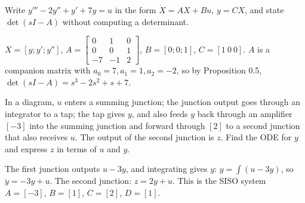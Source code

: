 \begin{qbox}[title={Q1.2 (medium)}]
Write $y'''-2y''+y'+7y=u$ in the form $\dot X=AX+Bu$, $y=CX$, and state $\det(sI-A)$ without computing a determinant.
\end{qbox}
\begin{solbox}
$X=[y;y';y'']$, $A=\begin{bmatrix}0&1&0\\0&0&1\\-7&-1&2\end{bmatrix}$, $B=[0;0;1]$, $C=[1\ 0\ 0]$.
$A$ is a companion matrix with $a_0=7,a_1=1,a_2=-2$, so by Proposition 0.5, $\det(sI-A)=s^3-2s^2+s+7$.
\end{solbox}

\begin{qbox}[title={Q1.3 (harder: reading a diagram)}]
In a diagram, $u$ enters a summing junction; the junction output goes through an integrator to a tap; the tap gives $y$, and also feeds $y$ back through
an amplifier $[-3]$ into the summing junction and forward through $[2]$ to a second junction that also receives $u$. The output of the second junction is $z$. Find the ODE for $y$ and express $z$ in terms of $u$ and $y$.
\end{qbox}
\begin{solbox}
The first junction outputs $u-3y$, and integrating gives $y$: $y=\int(u-3y)$, so $\dot y=-3y+u$. The second junction: $z=2y+u$.
This is the SISO system $A=[-3]$, $B=[1]$, $C=[2]$, $D=[1]$.
\end{solbox}
\newpage

